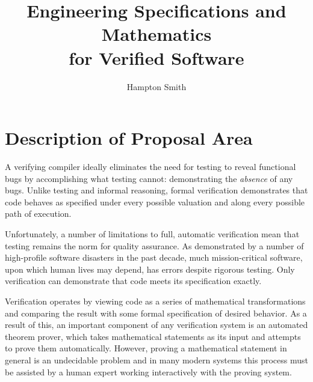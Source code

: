 \documentclass[10pt]{ClemsonProposal}
\title{Engineering Specifications and Mathematics\\for Verified Software}
\author{Hampton Smith}
\begin{document}
    \begin{frontmatter}
        \maketitle
		\tableofcontents
        \newpage

        
	\end{frontmatter}



    \doublespacing     %
    \pagestyle{fancy}  %

\section*{Description of Proposal Area}
\raggedbottom
A verifying compiler ideally eliminates the need for testing to reveal functional bugs by accomplishing what testing cannot: demonstrating the \emph{absence} of any bugs.  Unlike testing and informal reasoning, formal verification demonstrates that code behaves as specified under every possible valuation and along every possible path of execution.

Unfortunately, a number of limitations to full, automatic verification mean that testing remains the norm for quality assurance.  As demonstrated by a number of high-profile software disasters in the past decade, much mission-critical software, upon which human lives may depend, has errors despite rigorous testing.  Only verification can demonstrate that code meets its specification exactly.

Verification operates by viewing code as a series of mathematical transformations and comparing the result with some formal specification of desired behavior.  As a result of this, an important component of any verification system is an automated theorem prover, which takes mathematical statements as its input and attempts to prove them automatically.  However, proving a mathematical statement in general is an undecidable problem and in many modern systems this process must be assisted by a human expert working interactively with the proving system.
\end{document}
